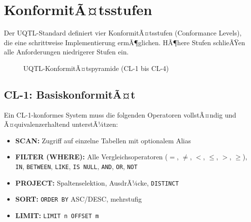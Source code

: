 ﻿%
\section{KonformitÃ¤tsstufen}
\label{sec:konformitaet}

Der UQTL-Standard definiert vier KonformitÃ¤tsstufen (Conformance Levels),
die eine schrittweise Implementierung ermÃ¶glichen. HÃ¶here Stufen schlieÃŸen
alle Anforderungen niedrigerer Stufen ein.

\begin{figure}[H]
\centering
{}
\caption{UQTL-KonformitÃ¤tspyramide (CL-1 bis CL-4)}
\label{fig:konformitaet}
\end{figure}

\subsection{CL-1: BasiskonformitÃ¤t}
\label{subsec:cl1}

Ein CL-1-konformes System muss die folgenden Operatoren vollstÃ¤ndig und
Ã¤quivalenzerhaltend unterstÃ¼tzen:

\begin{itemize}[leftmargin=1.5cm]
  \item \textbf{SCAN:} Zugriff auf einzelne Tabellen mit optionalem Alias
  \item \textbf{FILTER (WHERE):} Alle Vergleichsoperatoren ($=$, $\neq$, $<$, $\leq$, $>$, $\geq$),
    \texttt{IN}, \texttt{BETWEEN}, \texttt{LIKE}, \texttt{IS NULL}, \texttt{AND}, \texttt{OR}, \texttt{NOT}
  \item \textbf{PROJECT:} Spaltenselektion, AusdrÃ¼cke, \texttt{DISTINCT}
  \item \textbf{SORT:} \texttt{ORDER BY} ASC/DESC, mehrstufig
  \item \textbf{LIMIT:} \texttt{LIMIT n OFFSET m}
\end{itemize}

